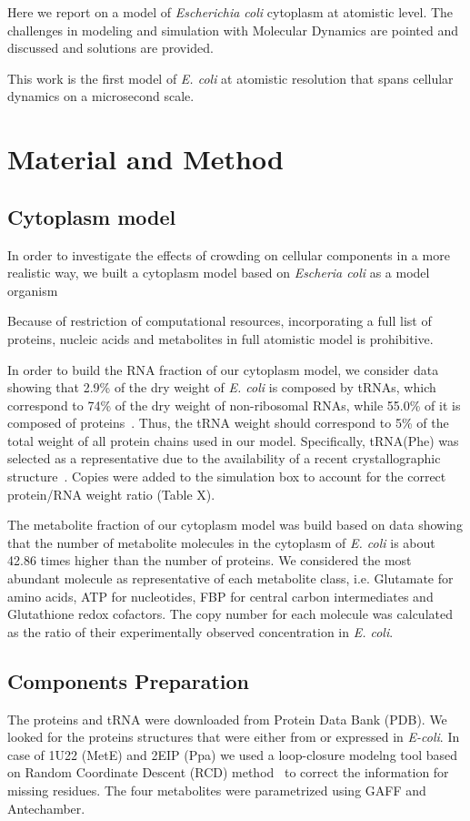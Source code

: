 \documentclass[journal=jacsat,manuscript=article]{achemso}
\begin{document}
Here we report on a model of {\em Escherichia coli} cytoplasm at atomistic level. The challenges in modeling and simulation with Molecular Dynamics are pointed and discussed and solutions are provided. 

This work is the first model of {\em E. coli} at atomistic resolution that spans cellular dynamics on a microsecond scale.




\section*{Material and Method}
\subsection*{Cytoplasm model}
In order to investigate the effects of crowding on cellular components in a more realistic way, we built a  cytoplasm model based on {\em Escheria coli} as a model organism~\cite{Dong1996,Bennett2009,Link1997,Mcguffee2010} 

Because of restriction of computational resources, incorporating a full list of proteins, nucleic acids and metabolites in full atomistic model is prohibitive.

In order to build the RNA fraction of our cytoplasm model, we consider data showing that 2.9\% of the dry weight of \textit{E. coli} is composed by tRNAs, which correspond to 74\% of the dry weight of non-ribosomal RNAs, while 55.0\% of it is composed of proteins~\cite{schaechter2006}. Thus, the tRNA weight should correspond to 5\% of the total weight of all protein chains used in our model. Specifically, tRNA(Phe) was selected as a representative due to the availability of a recent crystallographic structure~\cite{Byrne2015}. Copies were added to the simulation box to account for the correct protein/RNA weight ratio (Table X).


The metabolite fraction of our cytoplasm model was build based on data showing that the number of metabolite molecules in the cytoplasm of \textit{E. coli} is about 42.86 times higher than the number of proteins. We considered the most abundant molecule as representative of each metabolite class, i.e. Glutamate for amino acids, ATP for nucleotides, FBP for central carbon intermediates and Glutathione redox cofactors. The copy number for each molecule was calculated as the ratio of their experimentally observed concentration in {\em E. coli}.

\subsection*{Components Preparation}
The proteins and tRNA were downloaded from Protein Data Bank (PDB). We looked for the proteins structures that were either from or expressed in {\em E-coli}. In case of 1U22 (MetE) and 2EIP (Ppa) we used a loop-closure modelng tool based on Random Coordinate Descent (RCD) method~\cite{Chys2013} to correct the information for missing residues. The four metabolites were parametrized using GAFF and Antechamber. 
\end{document}
